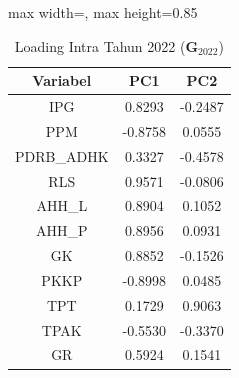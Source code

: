 \begin{table}[H]
\centering
\caption{Loading Intra Tahun 2022 ($\mathbf{G}_{2022}$)} \label{tab:loading_intra_2022}
\begin{adjustbox}{max width=\textwidth, max height=0.85\textheight}
\begin{tabular}{|c|c|c|}
\hline
\textbf{Variabel} & \textbf{PC1} & \textbf{PC2} \\
\hline
IPG & 0.8293 & -0.2487 \\
PPM & -0.8758 & 0.0555 \\
PDRB\_ADHK & 0.3327 & -0.4578 \\
RLS & 0.9571 & -0.0806 \\
AHH\_L & 0.8904 & 0.1052 \\
AHH\_P & 0.8956 & 0.0931 \\
GK & 0.8852 & -0.1526 \\
PKKP & -0.8998 & 0.0485 \\
TPT & 0.1729 & 0.9063 \\
TPAK & -0.5530 & -0.3370 \\
GR & 0.5924 & 0.1541 \\
\hline
\end{tabular}
\end{adjustbox}
\end{table}